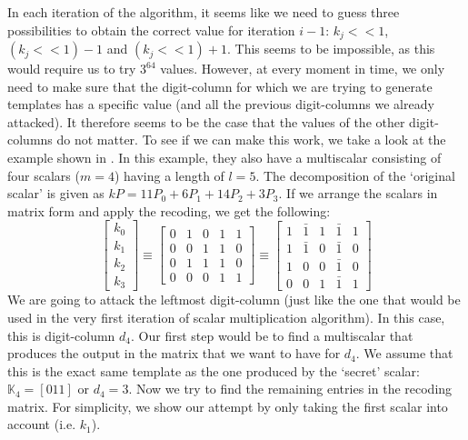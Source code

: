 In each iteration of the algorithm, it seems like we need to guess three possibilities to obtain the correct value for iteration $i - 1$: $k_j << 1$, $(k_j << 1) - 1$ and $(k_j << 1) + 1$. 
This seems to be impossible, as this would require us to try $3^{64}$ values.
However, at every moment in time, we only need to make sure that the digit-column for which we are trying to generate templates has a specific value (and all the previous digit-columns we already attacked).
It therefore seems to be the case that the values of the other digit-columns do not matter.
To see if we can make this work, we take a look at the example shown in \cite[Example 1]{faz2015efficient}.
In this example, they also have a multiscalar consisting of four scalars ($m = 4$) having a length of $l = 5$. 
The decomposition of the `original scalar' is given as $kP = 11P_0 + 6P_1 + 14P_2 + 3P_3$. 
If we arrange the scalars in matrix form and apply the recoding, we get the following:
%
\begin{equation*}
%
\begin{bmatrix}
k_0 \\
k_1 \\
k_2 \\
k_3 
\end{bmatrix}
%
\equiv
%
\begin{bmatrix}
0 & 1 & 0 & 1 & 1 \\
0 & 0 & 1 & 1 & 0 \\
0 & 1 & 1 & 1 & 0 \\
0 & 0 & 0 & 1 & 1 
\end{bmatrix}
%
\equiv
%
\begin{bmatrix}
1 & \bar{1} & 1 & \bar{1} & 1 \\
1 & \bar{1} & 0 & \bar{1} & 0 \\
1 & 0 & 0 & \bar{1} & 0 \\
0 & 0 & 1 & \bar{1} & 1
\end{bmatrix}
%
\end{equation*}
%
We are going to attack the leftmost digit-column (just like the one that would be used in the very first iteration of {\fourqs} scalar multiplication algorithm).
In this case, this is digit-column $d_4$.
Our first step would be to find a multiscalar that produces the output in the matrix that we want to have for $d_4$.
We assume that this is the exact same template as the one produced by the `secret' scalar: $\mathbb{K}_4 = \left[ 011 \right]$ or $d_4 = 3$.
Now we try to find the remaining entries in the recoding matrix. 
For simplicity, we show our attempt by only taking the first scalar into account (i.e. $k_1$). 
